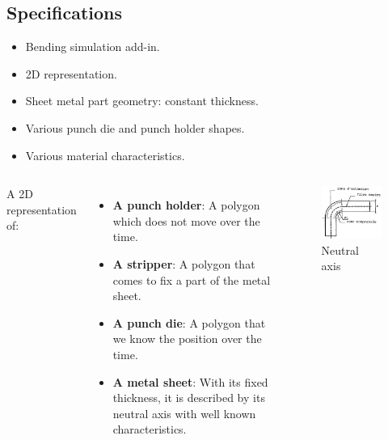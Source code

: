 \documentclass{beamer}
\begin{document}
\subsection{Specifications}
\begin{frame}
    \begin{itemize}
        \item Bending simulation add-in.
        \item 2D representation.
        \item Sheet metal part geometry: constant thickness.
        \item Various punch die and punch holder shapes.
        \item Various material characteristics.
    \end{itemize}
\end{frame}
\begin{frame}
    \begin{columns}
        A 2D representation of:
        \begin{itemize}
            \item \textbf{A punch holder}: 
                A polygon which does not move over the time.
            \item \textbf{A stripper}:
                A polygon that comes to fix a part of the metal sheet.
            \item \textbf{A punch die}:
                A polygon that we know the position over the time.
            \item \textbf{A metal sheet}:
                With its fixed thickness, it is described by its neutral axis with well known characteristics.
        \end{itemize}
        \begin{figure}
            \includegraphics[width=\textwidth]{img/fibreNeutre.jpg}
            \caption{Neutral axis}
            \label{FibreNeudre}
        \end{figure}
    \end{columns}
\end{frame}
\end{document}
